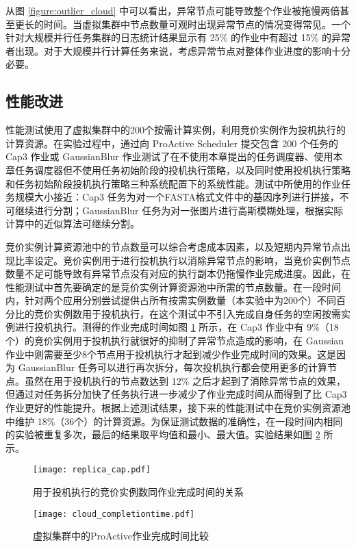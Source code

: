 从图 \ref{figure:outlier_cloud} 中可以看出，异常节点可能导致整个作业被拖慢两倍甚至更长的时间。当虚拟集群中节点数量可观时出现异常节点的情况变得常见。一个针对大规模并行任务集群的日志统计结果显示有 25\% 的作业中有超过 15\% 的异常者出现。对于大规模并行计算任务来说，考虑异常节点对整体作业进度的影响十分必要。

\subsection{性能改进}
\label{sec:no2_perf}
性能测试使用了虚拟集群中的200个按需计算实例，利用竞价实例作为投机执行的计算资源。在实验过程中，通过向 ProActive Scheduler 提交包含 200 个任务的 Cap3 作业或 GaussianBlur 作业测试了在不使用本章提出的任务调度器、使用本章任务调度器但不使用任务初始阶段的投机执行策略，以及同时使用投机执行策略和任务初始阶段投机执行策略三种系统配置下的系统性能。测试中所使用的作业任务规模大小接近：Cap3 任务为对一个FASTA格式文件中的基因序列进行拼接，不可继续进行分割；GaussianBlur 任务为对一张图片进行高斯模糊处理，根据实际计算中的近似算法可继续分割。

竞价实例计算资源池中的节点数量可以综合考虑成本因素，以及短期内异常节点出现比率设定。竞价实例用于进行投机执行以消除异常节点的影响，当竞价实例节点数量不足可能导致有异常节点没有对应的执行副本仍拖慢作业完成进度。因此，在性能测试中首先要确定的是竞价实例计算资源池中所需的节点数量。在一段时间内，针对两个应用分别尝试提供占所有按需实例数量（本实验中为200个）不同百分比的竞价实例数用于投机执行，在这个测试中不引入完成自身任务的空闲按需实例进行投机执行。测得的作业完成时间如图 \ref{figure:replica_cap} 所示，在 Cap3 作业中有 9\%（18个）的竞价实例用于投机执行就很好的抑制了异常节点造成的影响，在 Gaussian 作业中则需要至少8个节点用于投机执行才起到减少作业完成时间的效果。这是因为 GaussianBlur 任务可以进行再次拆分，每次投机执行都会使用更多的计算节点。虽然在用于投机执行的节点数达到 12\% 之后才起到了消除异常节点的效果，但通过对任务拆分加快了任务执行进一步减少了作业完成时间从而得到了比 Cap3 作业更好的性能提升。根据上述测试结果，接下来的性能测试中在竞价实例资源池中维护 18\%（36个）的计算资源。为保证测试数据的准确性，在一段时间内相同的实验被重复多次，最后的结果取平均值和最小、最大值。实验结果如图 \ref{figure:completiontime_cloud} 所示。
\begin{figure}
  \centering
  \texttt{[image: replica\_cap.pdf]}
  \caption{用于投机执行的竞价实例数同作业完成时间的关系}
  \label{figure:replica_cap}
\end{figure}

\begin{figure}
  \centering
  \texttt{[image: cloud\_completiontime.pdf]}
  \caption{虚拟集群中的ProActive作业完成时间比较}
  \label{figure:completiontime_cloud}
\end{figure}

